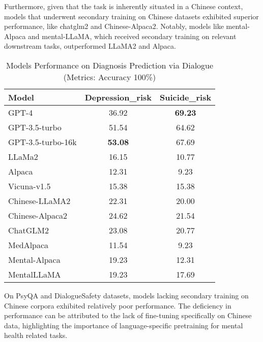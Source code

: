 Furthermore, given that the task is inherently situated in a Chinese context, models that underwent secondary training on Chinese datasets exhibited superior performance, like chatglm2 and Chinese-Alpaca2. Notably, models like mental-Alpaca and mental-LLaMA, which received secondary training on relevant downstream tasks, outperformed LLaMA2 and Alpaca.


\begin{table}[htpb]
\centering
\footnotesize
\begin{tabular}{l c c }
\hline
\textbf{Model} & \textbf{Depression\_risk} & \textbf{Suicide\_risk}\\
\hline
GPT-4 & 36.92 & \textbf{69.23}\\
GPT-3.5-turbo & 51.54 & 64.62\\
GPT-3.5-turbo-16k & \textbf{53.08} & 67.69\\
\hline
LLaMa2 & 16.15 & 10.77\\
Alpaca & 12.31 & 9.23\\
Vicuna-v1.5 & 15.38 & 15.38\\
\hline
Chinese-LLaMA2 & 22.31 & 20.00\\
Chinese-Alpaca2 & 24.62 & 21.54\\
ChatGLM2 & 23.08 & 20.77\\
\hline
MedAlpaca & 11.54 & 9.23\\
Mental-Alpaca & 19.23 & 12.31\\
MentalLLaMA & 19.23 & 17.69\\
\hline
\end{tabular}
\caption{Models Performance on Diagnosis Prediction via Dialogue (Metrics: Accuracy 100\%)}
\label{tab: D4}
\end{table}
On PsyQA and DialogueSafety datasets, models lacking secondary training on Chinese corpora exhibited relatively poor performance. The deficiency in performance can be attributed to the lack of fine-tuning specifically on Chinese data, highlighting the importance of language-specific pretraining for mental health related tasks.

